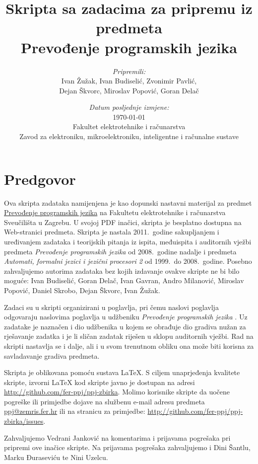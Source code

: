 \documentclass[times, 12pt, utf8]{book}
\title{
\vfill
Skripta sa zadacima za pripremu iz predmeta \\
Prevođenje programskih jezika \\
\vspace{70pt}
}
\author{
\emph{Pripremili:} \\
Ivan Žužak, Ivan Budiselić, Zvonimir Pavlić, \\
Dejan Škvorc, Miroslav Popović, Goran Delač \\}
\date{
\vspace{30pt} 
\emph{Datum posljednje izmjene:} \\
\today \\
\vfill
Fakultet elektrotehnike i računarstva \\
Zavod za elektroniku, mikroelektroniku, inteligentne i računalne sustave
}
\begin{document}
\maketitle

\let\cleardoublepage\clearpage

\tableofcontents


\chapter*{Predgovor}

\begin{spacing}{1.5}
Ova skripta zadataka namijenjena je kao dopunski nastavni materijal za predmet \href{http://www.fer.unizg.hr/predmet/ppj_a}{Prevođenje programskih jezika} na Fakultetu elektrotehnike i računarstva Sveučilišta u Zagrebu. 
U svojoj PDF inačici, skripta je besplatno dostupna na Web-stranici predmeta.
Skripta je nastala 2011.~godine sakupljanjem i uređivanjem zadataka i teorijskih pitanja iz ispita, međuispita i auditornih vježbi predmeta \emph{Prevođenje programskih jezika} od 2008.~godine nadalje i predmeta \emph{Automati, formalni jezici i jezični procesori 2} od 1999.~do 2008.~godine.
Posebno zahvaljujemo autorima zadataka bez kojih izdavanje ovakve skripte ne bi bilo moguće:
Ivan Budiselić,
Goran Delač,
Ivan Gavran,
Andro Milanović,
Miroslav Popović,
Daniel Skrobo,
Dejan Škvorc,
Ivan Žužak.

Zadaci su u skripti organizirani u poglavlja, pri čemu naslovi poglavlja odgovaraju naslovima poglavlja u udžbeniku \emph{Prevođenje programskih jezika} \cite{udzbenik}.
Uz zadatake je naznačen i dio udžbenika u kojem se obrađuje dio gradiva nužan za rješavanje zadatka i je li sličan zadatak riješen u sklopu auditornih vježbi.
Rad na skripti nastavlja se i dalje, ali i u svom trenutnom obliku ona može biti korisna za savladavanje gradiva predmeta.

Skripta je oblikovana pomoću sustava \LaTeX{}.
S ciljem unaprjeđenja kvalitete skripte, izvorni \LaTeX{} kod skripte javno je dostupan na adresi \url{http://github.com/fer-ppj/ppj-zbirka}.
Molimo korisnike skripte da uočene pogreške ili primjedbe dojave na službenu e-mail adresu predmeta \href{mailto:ppj@zemris.fer.hr}{ppj@zemris.fer.hr} ili na stranicu za primjedbe: \url{http://github.com/fer-ppj/ppj-zbirka/issues}. 

Zahvaljujemo Vedrani Janković na komentarima i prijavama pogrešaka pri pripremi ove inačice skripte.
Na prijavama pogrešaka zahvaljujemo i Dini Šantlu, Marku Đuraseviću te Nini Uzelcu.
\end{spacing}
\end{document}
